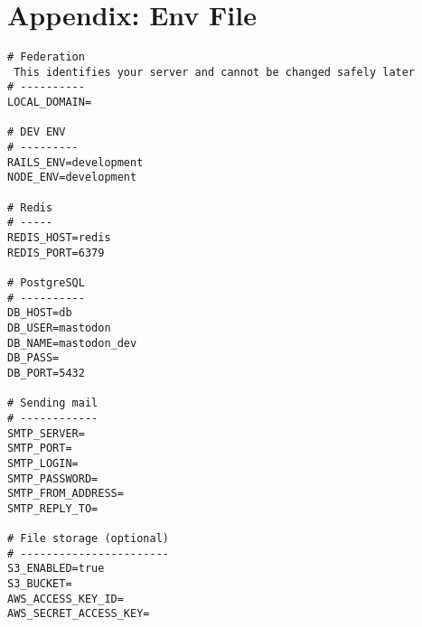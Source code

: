 \chapter{Appendix: Env File}
\label{appendix:env_file}

\begin{verbatim}
# Federation
 This identifies your server and cannot be changed safely later
# ----------
LOCAL_DOMAIN= 

# DEV ENV
# ---------
RAILS_ENV=development
NODE_ENV=development

# Redis
# -----
REDIS_HOST=redis
REDIS_PORT=6379

# PostgreSQL
# ----------
DB_HOST=db
DB_USER=mastodon
DB_NAME=mastodon_dev
DB_PASS=
DB_PORT=5432

# Sending mail
# ------------
SMTP_SERVER=
SMTP_PORT=
SMTP_LOGIN=
SMTP_PASSWORD=
SMTP_FROM_ADDRESS=
SMTP_REPLY_TO=

# File storage (optional)
# -----------------------
S3_ENABLED=true
S3_BUCKET=
AWS_ACCESS_KEY_ID=
AWS_SECRET_ACCESS_KEY=

\end{verbatim}